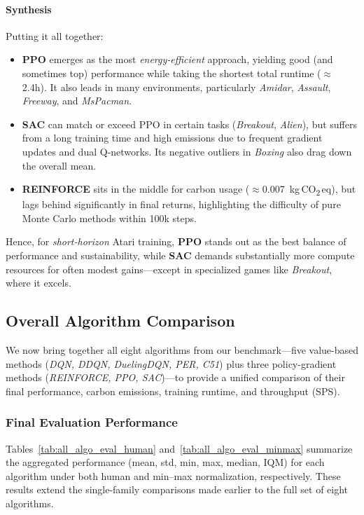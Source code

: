 \paragraph{Synthesis}
Putting it all together:
\begin{itemize}
	\item \textbf{PPO} emerges as the most \emph{energy‐efficient} approach, yielding good (and sometimes top) performance while taking the shortest total runtime ($\approx$2.4h). It also leads in many environments, particularly \emph{Amidar}, \emph{Assault}, \emph{Freeway}, and \emph{MsPacman}.
	\item \textbf{SAC} can match or exceed PPO in certain tasks (\emph{Breakout}, \emph{Alien}), but suffers from a long training time and high emissions due to frequent gradient updates and dual Q‐networks. Its negative outliers in \emph{Boxing} also drag down the overall mean.
	\item \textbf{REINFORCE} sits in the middle for carbon usage ($\approx$\num{0.007}~kg\,CO\textsubscript{2}\,eq), but lags behind significantly in final returns, highlighting the difficulty of pure Monte Carlo methods within 100k steps.
\end{itemize}
Hence, for \emph{short‐horizon} Atari training, \textbf{PPO} stands out as the best balance of performance and sustainability, while \textbf{SAC} demands substantially more compute resources for often modest gains—except in specialized games like \emph{Breakout}, where it excels. 

\subsection{Overall Algorithm Comparison}
\label{subsec:overall_algo_comparison}

We now bring together all eight algorithms from our benchmark—five value-based methods 
(\emph{DQN, DDQN, DuelingDQN, PER, C51}) plus three policy-gradient methods 
(\emph{REINFORCE, PPO, SAC})—to provide a unified comparison of their final performance, 
carbon emissions, training runtime, and throughput (SPS).

\subsubsection{Final Evaluation Performance}

Tables~\ref{tab:all_algo_eval_human} and~\vref{tab:all_algo_eval_minmax} summarize the 
aggregated performance (mean, std, min, max, median, IQM) for each algorithm under both 
human and min--max normalization, respectively. These results extend 
the single-family comparisons made earlier to the full set of eight algorithms.

